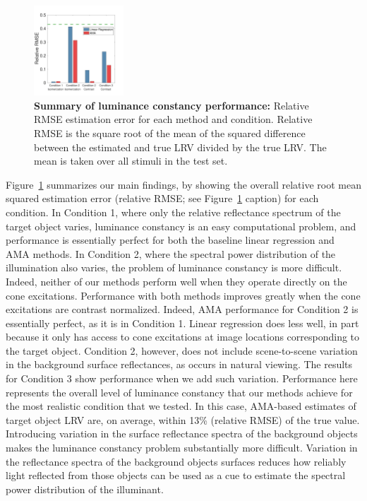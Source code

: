 \documentclass{jov}
\begin{document}
\begin{figure}
\centering
\includegraphics[width=0.3\textwidth]{../FiguresDraft5/Figure14/Figure14.pdf}
\caption{{\bf Summary of luminance constancy performance:} Relative RMSE estimation error for each method and condition. Relative RMSE is the square root of the mean of the squared difference between the estimated and true LRV divided by the true LRV. The mean is taken over all stimuli in the test set.}
 \label{fig:barGraphs}
\end{figure}

Figure~\ref{fig:barGraphs} summarizes our main findings, by showing the overall relative root mean squared estimation error (relative RMSE; see Figure~\ref{fig:barGraphs} caption) for each condition. 
In Condition 1, where only the relative reflectance spectrum of the target object varies, 
luminance constancy is an easy computational problem,
and performance is essentially perfect for both the baseline linear regression and AMA methods.
In Condition 2, where the spectral power distribution of the illumination also varies, the problem of luminance constancy is more difficult.
Indeed, neither of our methods perform well when they operate directly on the cone excitations.
Performance with both methods improves greatly when the cone excitations are contrast normalized. 
Indeed, AMA performance for Condition 2 is essentially perfect, as it is in Condition 1.
Linear regression does less well, in part because it only has access to cone excitations at image locations
corresponding to the target object.
Condition 2, however, does not include scene-to-scene variation in the background surface reflectances,
as occurs in natural viewing.
The results for Condition 3 show performance when we add such variation.
Performance here represents the overall level of luminance constancy that our methods achieve for the
most realistic condition that we tested.
In this case, AMA-based estimates of target object LRV are, on average, within 13\% (relative RMSE) of the true value.
Introducing variation in the surface reflectance spectra of the background objects makes 
the luminance constancy problem substantially more difficult. 
Variation in the reflectance spectra of the background objects surfaces reduces how 
reliably light reflected from those objects can be used as a cue to estimate the spectral power distribution of the illuminant.
\end{document}
